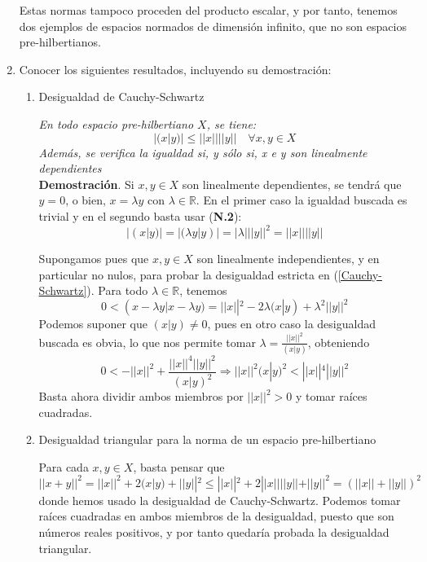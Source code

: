 \documentclass[a4paper, 12pt]{article}
\begin{document}
\begin{enumerate}[label=\textbf{\arabic*}.]
Estas normas tampoco proceden del producto escalar, y por tanto, tenemos dos ejemplos de espacios normados de dimensión infinito, que no son espacios pre-hilbertianos.

\medskip

\item Conocer los siguientes resultados, incluyendo su demostración:
	\begin{enumerate}[label=\textit{\alph*})]
		\item Desigualdad de Cauchy-Schwartz
		
		\textit{En todo espacio pre-hilbertiano \(X\), se tiene:}
\begin{equation}\label{Cauchy-Schwartz}
	|(x|y)| \leq ||x|| ||y|| \quad \forall x,y \in X
\end{equation}
\textit{Además, se verifica la igualdad si, y sólo si, x e y son linealmente dependientes} \\

\textbf{Demostración}. Si \(x,y \in X\) son linealmente dependientes, se tendrá que \(y=0\), o bien, \(x = \lambda y\) con \(\lambda \in \mathbb{R}\). En el primer caso la igualdad buscada es trivial y en el segundo basta usar (\textbf{N.2}):
\[
	|(x|y)| = |(\lambda y | y)| = |\lambda| ||y||^2 = ||x|| ||y||
\]

Supongamos pues que \(x,y \in X\) son linealmente independientes, y en particular no nulos, para probar la desigualdad estricta en (\ref{Cauchy-Schwartz}). Para todo \(\lambda \in \mathbb{R}\), tenemos
\[
	0 < (x - \lambda y | x - \lambda y) = ||x||^2 - 2 \lambda (x|y) + \lambda^2 ||y||^2
\]
Podemos suponer que \((x|y) \neq 0\), pues en otro caso la desigualdad buscada es obvia, lo que nos permite tomar \(\lambda = \frac{||x||^2}{(x|y)}\), obteniendo
\[
	0 < -||x||^2 + \frac{||x||^4 ||y||^2}{(x|y)^2} \Rightarrow ||x||^2 (x|y)^2 < ||x||^4 ||y||^2
\]
Basta ahora dividir ambos miembros por \(||x||^2 > 0\) y tomar raíces cuadradas.

\medskip

	\item Desigualdad triangular para la norma de un espacio pre-hilbertiano
	
Para cada \(x,y \in X\), basta pensar que 
\[
	||x+y||^2 = ||x||^2 + 2(x|y) + ||y||^2 \leq ||x||^2 +2 ||x|| ||y|| + ||y||^2 = (||x|| + ||y||)^2
\]
donde hemos usado la desigualdad de Cauchy-Schwartz. Podemos tomar raíces cuadradas en ambos miembros de la desigualdad, puesto que son números reales positivos, y por tanto quedaría probada la desigualdad triangular.
	\end{enumerate}

\end{enumerate}
\end{document}
